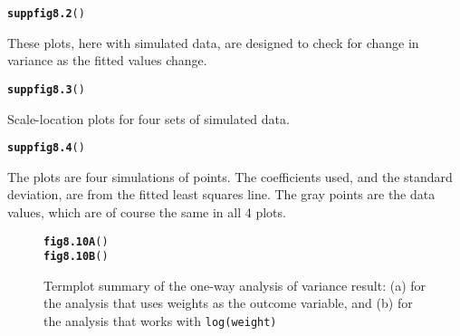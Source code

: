 \documentclass[12pt, a4paper,  BCOR=8.25mm, DIV=15]{scrartcl}\usepackage[]{graphicx}\usepackage[]{color}
\makeatletter
\newcommand{\hlstd}[1]{\textcolor[rgb]{0.345,0.345,0.345}{#1}}%
\newcommand{\hlkwd}[1]{\textcolor[rgb]{0.737,0.353,0.396}{\textbf{#1}}}%
\newenvironment{kframe}{%
 \def\at@end@of@kframe{}%
 \ifinner\ifhmode%
  \def\at@end@of@kframe{\end{minipage}}%
  \begin{minipage}{\columnwidth}%
 \fi\fi%
 \def\FrameCommand##1{\hskip\@totalleftmargin \hskip-\fboxsep
 \colorbox{shadecolor}{##1}\hskip-\fboxsep
     \hskip-\linewidth \hskip-\@totalleftmargin \hskip\columnwidth}%
 \MakeFramed {\advance\hsize-\width
   \@totalleftmargin\z@ \linewidth\hsize
   \@setminipage}}%
 {\par\unskip\endMakeFramed%
 \at@end@of@kframe}
\newenvironment{knitrout}{}{} %
\newcommand{\txtt}[1]{{\texttt{#1}}}
\makeatother
\begin{document}
\begin{suppfigure}[H]
\begin{knitrout}
\color{fgcolor}\begin{kframe}
\begin{alltt}
\hlkwd{suppfig8.2}\hlstd{()}
\end{alltt}
\end{kframe}
\end{knitrout}
\caption{These plots, here with simulated data, are designed to
  check for change in variance as the fitted values
  change.\label{fig:mftimecheck3}}
\end{suppfigure}

\begin{suppfigure}[H]
\begin{knitrout}
\color{fgcolor}\begin{kframe}
\begin{alltt}
\hlkwd{suppfig8.3}\hlstd{()}
\end{alltt}
\end{kframe}
\end{knitrout}
\caption{Scale-location plots for four sets of simulated
  data.}\label{fig:mftimesimdiag3}
\end{suppfigure}

\begin{suppfigure}[H]
\begin{knitrout}
\color{fgcolor}\begin{kframe}
\begin{alltt}
\hlkwd{suppfig8.4}\hlstd{()}
\end{alltt}
\end{kframe}
\end{knitrout}
\vspace*{-9pt}

\caption{The plots are four simulations of points.  The coefficients
  used, and the standard deviation, are from the fitted least squares
  line. The gray points are the data values, which are of course the
same in all 4 plots.}\label{fig:4sim-nimff}
\end{suppfigure}

\begin{figure}[H]
\begin{knitrout}
\color{fgcolor}\begin{kframe}
\begin{alltt}
\hlkwd{fig8.10A}\hlstd{()}
\hlkwd{fig8.10B}\hlstd{()}
\end{alltt}
\end{kframe}
\end{knitrout}
 \caption{Termplot summary of the one-way analysis of variance result:
(a) for the analysis that uses weights as the outcome variable, and
(b) for the analysis that works with \txtt{log(weight)}}
\label{fig:tomatoterm}
\end{figure}
\end{document}
